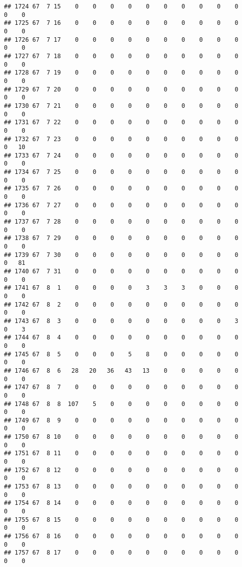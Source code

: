 \documentclass[]{article}
\begin{document}
\begin{verbatim}
## 1724 67  7 15    0    0    0    0    0    0    0    0    0    0    0    0
## 1725 67  7 16    0    0    0    0    0    0    0    0    0    0    0    0
## 1726 67  7 17    0    0    0    0    0    0    0    0    0    0    0    0
## 1727 67  7 18    0    0    0    0    0    0    0    0    0    0    0    0
## 1728 67  7 19    0    0    0    0    0    0    0    0    0    0    0    0
## 1729 67  7 20    0    0    0    0    0    0    0    0    0    0    0    0
## 1730 67  7 21    0    0    0    0    0    0    0    0    0    0    0    0
## 1731 67  7 22    0    0    0    0    0    0    0    0    0    0    0    0
## 1732 67  7 23    0    0    0    0    0    0    0    0    0    0    0   10
## 1733 67  7 24    0    0    0    0    0    0    0    0    0    0    0    0
## 1734 67  7 25    0    0    0    0    0    0    0    0    0    0    0    0
## 1735 67  7 26    0    0    0    0    0    0    0    0    0    0    0    0
## 1736 67  7 27    0    0    0    0    0    0    0    0    0    0    0    0
## 1737 67  7 28    0    0    0    0    0    0    0    0    0    0    0    0
## 1738 67  7 29    0    0    0    0    0    0    0    0    0    0    0    0
## 1739 67  7 30    0    0    0    0    0    0    0    0    0    0    0   81
## 1740 67  7 31    0    0    0    0    0    0    0    0    0    0    0    0
## 1741 67  8  1    0    0    0    0    3    3    3    0    0    0    0    0
## 1742 67  8  2    0    0    0    0    0    0    0    0    0    0    0    0
## 1743 67  8  3    0    0    0    0    0    0    0    0    0    3    0    3
## 1744 67  8  4    0    0    0    0    0    0    0    0    0    0    0    0
## 1745 67  8  5    0    0    0    5    8    0    0    0    0    0    0    0
## 1746 67  8  6   28   20   36   43   13    0    0    0    0    0    0    0
## 1747 67  8  7    0    0    0    0    0    0    0    0    0    0    0    0
## 1748 67  8  8  107    5    0    0    0    0    0    0    0    0    0    0
## 1749 67  8  9    0    0    0    0    0    0    0    0    0    0    0    0
## 1750 67  8 10    0    0    0    0    0    0    0    0    0    0    0    0
## 1751 67  8 11    0    0    0    0    0    0    0    0    0    0    0    0
## 1752 67  8 12    0    0    0    0    0    0    0    0    0    0    0    0
## 1753 67  8 13    0    0    0    0    0    0    0    0    0    0    0    0
## 1754 67  8 14    0    0    0    0    0    0    0    0    0    0    0    0
## 1755 67  8 15    0    0    0    0    0    0    0    0    0    0    0    0
## 1756 67  8 16    0    0    0    0    0    0    0    0    0    0    0    0
## 1757 67  8 17    0    0    0    0    0    0    0    0    0    0    0    0

\end{verbatim}
\end{document}
